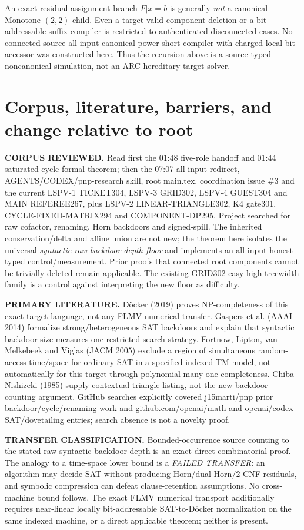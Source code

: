 \documentclass[11pt]{article}
\begin{document}
An exact residual assignment branch $F|x=b$ is generally \emph{not} a canonical Monotone $(2,2)$ child. Even a target-valid component deletion or a bit-addressable suffix compiler is restricted to authenticated disconnected cases. No connected-source all-input canonical power-short compiler with charged local-bit accessor was constructed here. Thus the recursion above is a source-typed noncanonical simulation, not an ARC hereditary target solver.

\section{Corpus, literature, barriers, and change relative to root}
\noindent\textbf{CORPUS REVIEWED.} Read first the 01:48 five-role handoff and 01:44 saturated-cycle formal theorem; then the 07:07 all-input redirect, AGENTS/CODEX/pnp-research skill, root main.tex, coordination issue \#3 and the current LSPV-1 TICKET304, LSPV-3 GRID302, LSPV-4 GUEST304 and MAIN REFEREE267, plus LSPV-2 LINEAR-TRIANGLE302, K4 gate301, CYCLE-FIXED-MATRIX294 and COMPONENT-DP295. Project searched for raw cofactor, renaming, Horn backdoors and signed-spill. The inherited conservation/delta and affine union are not new; the theorem here isolates the universal \emph{syntactic raw-backdoor depth floor} and implements an all-input honest typed control/measurement. Prior proofs that connected root components cannot be trivially deleted remain applicable. The existing GRID302 easy high-treewidth family is a control against interpreting the new floor as difficulty.

\noindent\textbf{PRIMARY LITERATURE.} D\"ocker (2019) proves NP-completeness of this exact target language, not any FLMV numerical transfer. Gaspers et al. (AAAI 2014) formalize strong/heterogeneous SAT backdoors and explain that syntactic backdoor size measures one restricted search strategy. Fortnow, Lipton, van Melkebeek and Viglas (JACM 2005) exclude a region of simultaneous random-access time/space for ordinary SAT in a specified indexed-TM model, not automatically for this target through polynomial many-one completeness. Chiba--Nishizeki (1985) supply contextual triangle listing, not the new backdoor counting argument. GitHub searches explicitly covered j15marti/pnp prior backdoor/cycle/renaming work and github.com/openai/math and openai/codex SAT/dovetailing entries; search absence is not a novelty proof.

\noindent\textbf{TRANSFER CLASSIFICATION.} Bounded-occurrence source counting to the stated raw syntactic backdoor depth is an exact direct combinatorial proof. The analogy to a time-space lower bound is a \emph{FAILED TRANSFER}: an algorithm may decide SAT without producing Horn/dual-Horn/2-CNF residuals, and symbolic compression can defeat clause-retention assumptions. No cross-machine bound follows. The exact FLMV numerical transport additionally requires near-linear locally bit-addressable SAT-to-D\"ocker normalization on the same indexed machine, or a direct applicable theorem; neither is present.
\end{document}
